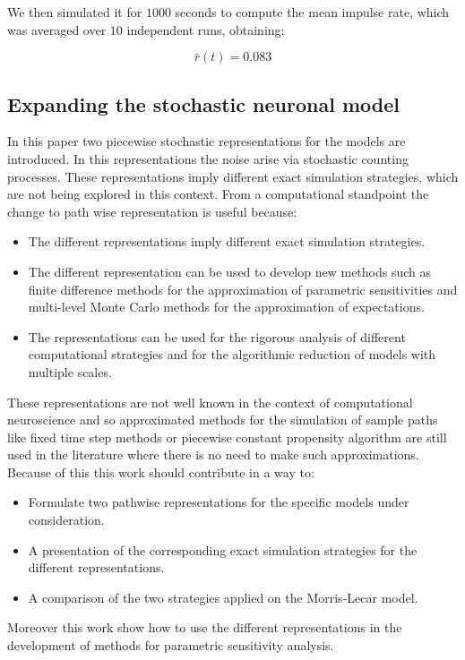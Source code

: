 		We then simulated it for $1000$ seconds to compute the mean impulse rate, which was averaged over $10$ independent runs, obtaining:

		$$\bar{r}(t) = 0.083$$


	\subsection{Expanding the stochastic neuronal model}
	In this paper two piecewise stochastic representations for the models are introduced.
	In this representations the noise arise via stochastic counting processes.
	These representations imply different exact simulation strategies, which are not being explored in this context.
	From a computational standpoint the change to path wise representation is useful because:

	\begin{itemize}
		\item The different representations imply different exact simulation strategies.
		\item The different representation can be used to develop new methods such as finite difference methods for the approximation of parametric sensitivities and multi-level Monte Carlo methods for the approximation of expectations.
		\item The representations can be used for the rigorous analysis of different computational strategies and for the algorithmic reduction of models with multiple scales.
	\end{itemize}

	These representations are not well known in the context of computational neuroscience and so approximated methods for the simulation of sample paths like fixed time step methods or piecewise constant propensity algorithm are still used in the literature where there is no need to make such approximations.
	Because of this this work should contribute in a way to:

	\begin{itemize}
		\item Formulate two pathwise representations for the specific models under consideration.
		\item A presentation of the corresponding exact simulation strategies for the different representations.
		\item A comparison of the two strategies applied on the Morris-Lecar model.
	\end{itemize}

	Moreover this work show how to use the different representations in the development of methods for parametric sensitivity analysis.
